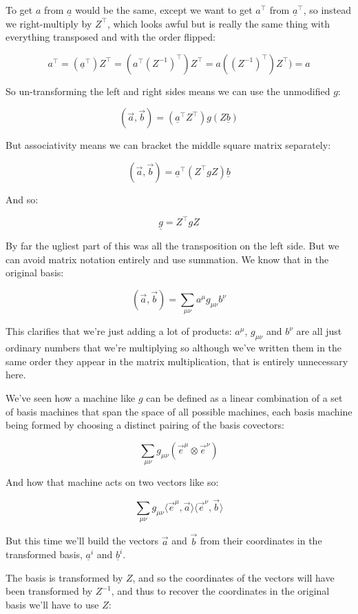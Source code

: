 To get $a$ from $\underline{a}$ would be the same, except we want to get $a^\intercal$ from $\underline{a}^\intercal$, so instead we right-multiply by $Z^\intercal$, which looks awful but is really the same thing with everything transposed and with the order flipped:

$$
a^\intercal = (\underline{a}^\intercal)Z^\intercal = (a^\intercal (Z^{-1})^\intercal) Z^\intercal = a((Z^{-1})^\intercal) Z^\intercal) = a
$$

So un-transforming the left and right sides means we can use the unmodified $g$:

$$
(\vec{a}, \vec{b}) = (\underline{a}^\intercal Z^\intercal) g (Z \underline{b}) 
$$

But associativity means we can bracket the middle square matrix separately:

$$
(\vec{a}, \vec{b}) = \underline{a}^\intercal (Z^\intercal g Z) \underline{b} 
$$

And so:

$$
\underline{g} = Z^\intercal g Z
$$

By far the ugliest part of this was all the transposition on the left side. But we can avoid matrix notation entirely and use summation. We know that in the original basis:

$$
(\vec{a}, \vec{b}) = \sum_{\mu\nu} a^{\mu} g_{\mu\nu} b^{\nu}
$$

This clarifies that we're just adding a lot of products: $a^{\mu}$, $g_{\mu\nu}$ and $b^{\nu}$ are all just ordinary numbers that we're multiplying so although we've written them in the same order they appear in the matrix multiplication, that is entirely unnecessary here.

We've seen how a machine like $g$ can be defined as a linear combination of a set of basis machines that span the space of all possible machines, each basis machine being formed by choosing a distinct pairing of the basis covectors:

$$
\sum_{\mu\nu} g_{\mu\nu} (\vec{e}^\mu \otimes \vec{e}^\nu)
$$

And how that machine acts on two vectors like so:

$$
\sum_{\mu\nu} g_{\mu\nu} \langle \vec{e}^\mu,\vec{a} \rangle \langle \vec{e}^\nu,\vec{b} \rangle
$$

But this time we'll build the vectors $\vec{a}$ and $\vec{b}$ from their coordinates in the transformed basis, $\underline{a}^{i}$ and $\underline{b}^{i}$.

The basis is transformed by $Z$, and so the coordinates of the vectors will have been transformed by $Z^{-1}$, and thus to recover the coordinates in the original basis we'll have to use $Z$:

